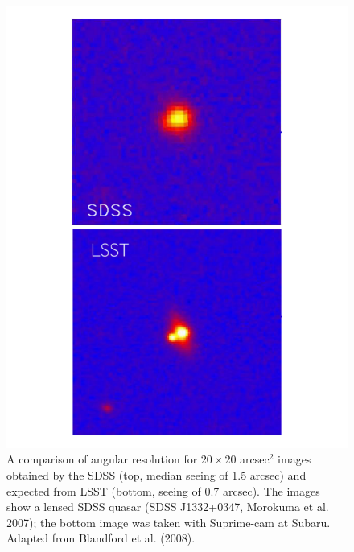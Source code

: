 \documentclass{emulateapj}
\begin{document}
\begin{figure}
\includegraphics[width=1.0\hsize,clip]{panels2.pdf}
\caption{A comparison of angular resolution for $20\times20$ arcsec$^2$ images obtained 
by the SDSS (top, median seeing of 1.5 arcsec) and expected from LSST (bottom,
seeing of 0.7 arcsec). The images show a lensed SDSS quasar (SDSS J1332+0347,
Morokuma et al. 2007); the bottom image was taken with Suprime-cam at Subaru. 
Adapted from Blandford et al. (2008).} 
\label{Fig:panels2}
\end{figure}
\end{document}
